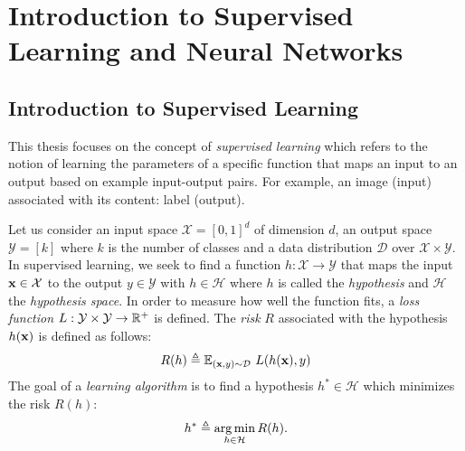 \section{Introduction to Supervised Learning and Neural Networks}
\label{secction:ch2-supervised_learning_neural_networks}


\subsection{Introduction to Supervised Learning}
\label{subsection:ch1-introduction_to_supervised_learning}

This thesis focuses on the concept of \emph{supervised learning} which refers to the notion of learning the parameters of a specific function that maps an input to an output based on example input-output pairs.
For example, an image (input) associated with its content: label (output).

Let us consider an input space $\mathcal{X} = [0, 1]^d$ of dimension $d$, an output space $\mathcal{Y} = [k]$ where $k$ is the number of classes and a data distribution $\mathcal{D}$ over $\mathcal{X} \times \mathcal{Y}$.
In supervised learning, we seek to find a function $h: \mathcal{X} \rightarrow \mathcal{Y}$ that maps the input $\mathbf{x} \in \mathcal{X}$ to the output $y \in \mathcal{Y}$ with $h \in \mathcal{H}$ where $h$ is called the \emph{hypothesis} and $\mathcal{H}$ the \emph{hypothesis space}.
In order to measure how well the function fits, a \emph{loss function} $L: \mathcal{Y} \times \mathcal{Y} \rightarrow \mathbb{R}^{+}$ is defined.
The \emph{risk} $R$ associated with the hypothesis $h(\mathbf{x})$ is defined as follows:
\begin{equation}
  R(h) \triangleq \Ebb_{(\xvec, y) \sim \mathcal{D}}\  L \left( h(\xvec), y \right)
\end{equation}
The goal of a \emph{learning algorithm} is to find a hypothesis $h^* \in \mathcal{H}$ which minimizes the risk $R(h)$:
\begin{equation}
  h^* \triangleq \operatorname*{arg\,min}_{h \in \mathcal{H}} R(h) .
\end{equation}

